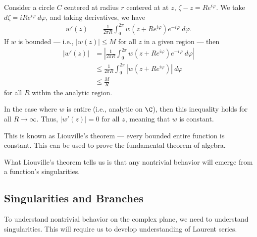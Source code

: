 \documentclass[10pt]{mypackage}
\begin{document}
\begin{example}
  Consider a circle $C$ centered at radius $r$ centered at at $z$, $\zeta - z = Re^{i\varphi}$. We take $d\zeta = iRe^{i\varphi}\:d\varphi$, and taking derivatives, we have
  \begin{align*}
    w'(z) &= \frac{1}{2\pi R} \int_{0}^{2\pi} w\left(z + Re^{i\varphi}\right)e^{-i\varphi}\:d\varphi.
  \end{align*}
  If $w$ is bounded --- i.e., $\left\vert w(z) \right\vert \leq M$ for all $z$ in a given region --- then
  \begin{align*}
    \left\vert w'(z) \right\vert &= \left\vert \frac{1}{2\pi R} \int_{0}^{2\pi} w\left(z + Re^{i\varphi}\right)e^{-i\varphi}\:d\varphi \right\vert\\
                                 &\leq \frac{1}{2\pi R} \int_{0}^{2\pi} \left\vert w\left(z + Re^{i\varphi}\right) \right\vert\:d\varphi\\
                                 &\leq \frac{M}{R}
  \end{align*}
  for all $R$ within the analytic region.\newline

  In the case where $w$ is entire (i.e., analytic on $\C$), then this inequality holds for all $R\rightarrow\infty$. Thus, $\left\vert w'(z) \right\vert = 0$ for all $z$, meaning that $w$ is constant.\newline

  This is known as Liouville's theorem --- every bounded entire function is constant. This can be used to prove the fundamental theorem of algebra.\newline

  What Liouville's theorem tells us is that any nontrivial behavior will emerge from a function's singularities.
\end{example}
\subsection{Singularities and Branches}%
To understand nontrivial behavior on the complex plane, we need to understand singularities. This will require us to develop understanding of Laurent series.
\end{document}
